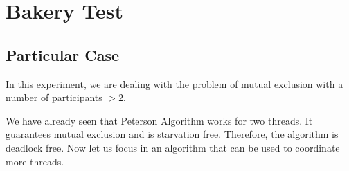 \section{\textbf{Bakery Test}}
\subsection{Particular Case}
\par
In this experiment, we are dealing with the problem of mutual exclusion with a
number of participants $>2$.
\par
We have already seen that Peterson Algorithm works for two threads. It guarantees
mutual exclusion and is starvation free. Therefore, the algorithm is deadlock
free. Now let us focus in an algorithm that can be used to coordinate more
threads.
\par
